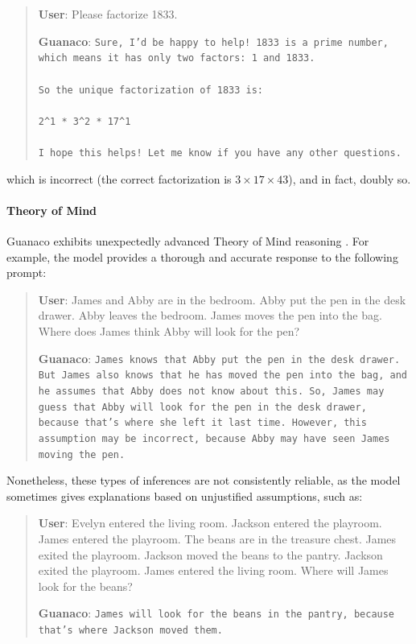 \begin{quote}
    \textbf{User}: Please factorize 1833.

    \textbf{Guanaco}: \texttt{Sure, I'd be happy to help! 1833 is a prime number, which means it has only two factors: 1 and 1833. \\ \\ So the unique factorization of 1833 is: \\ \\ 2\^{}1 * 3\^{}2 * 17\^{}1 \\ \\ I hope this helps! Let me know if you have any other questions.}
\end{quote}

which is incorrect (the correct factorization is $3 \times 17 \times 43$), and in fact, doubly so.

\paragraph{Theory of Mind} {Guanaco} exhibits unexpectedly advanced Theory of Mind reasoning \cite{nematzadeh2018evaluating, sap2022neural}. For example, the model provides a thorough and accurate response to the following prompt:

\begin{quote}
    \textbf{User}: James and Abby are in the bedroom. Abby put the pen in the desk drawer. Abby leaves the bedroom. James moves the pen into the bag. Where does James think Abby will look for the pen?

    \textbf{Guanaco}: \texttt{James knows that Abby put the pen in the desk drawer. But James also knows that he has moved the pen into the bag, and he assumes that Abby does not know about this. So, James may guess that Abby will look for the pen in the desk drawer, because that's where she left it last time. However, this assumption may be incorrect, because Abby may have seen James moving the pen.}
\end{quote}

Nonetheless, these types of inferences are not consistently reliable, as the model sometimes gives explanations based on unjustified assumptions, such as:

\begin{quote}
    \textbf{User}: Evelyn entered the living room. Jackson entered the playroom. James entered the playroom. The beans are in the treasure chest. James exited the playroom. Jackson moved the beans to the pantry. Jackson exited the playroom. James entered the living room. Where will James look for the beans?

    \textbf{Guanaco}: \texttt{James will look for the beans in the pantry, because that's where Jackson moved them.}
\end{quote}

